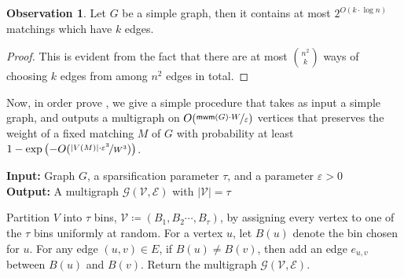 \documentclass[a4paper,11pt]{article}
\newcommand{\card}[1]{|#1|}
\newcommand{\paren}[1]{\left ( #1 \right )}
\newcommand{\eps}{\varepsilon}
\renewcommand{\algorithmicrequire}{\textbf{Input:}}
\renewcommand{\algorithmicensure}{\textbf{Output:}}
\theoremstyle{definition}
\theoremstyle{definition}
\theoremstyle{definition}
\theoremstyle{definition}
\theoremstyle{definition}
\theoremstyle{definition}
\theoremstyle{definition}
\newtheorem{observation2}[definition2]{Observation}
\theoremstyle{definition}
\theoremstyle{definition}
\theoremstyle{definition}
\theoremstyle{definition}
\theoremstyle{definition}
\theoremstyle{definition}
\theoremstyle{definition}
\theoremstyle{definition}
\begin{document}
\simpletomulti*

\begin{observation2}
Let $G$ be a simple graph, then it contains at most $2^{O(k\cdot \log n)}$ matchings which have $k$ edges.
\end{observation2}
\begin{proof}
This is evident from the fact that there are at most ${n^2 \choose k}$ ways of choosing $k$ edges from among $n^2$ edges in total. 
\end{proof}

Now, in order prove , we give a simple procedure that takes as input a simple graph, and outputs a multigraph on $O(\nicefrac{\textsf{mwm}(G)\cdot W}{\eps})$ vertices that preserves the weight of a fixed matching $M$ of $G$ with probability at least $1-\exp\paren{-O(\nicefrac{\card{V(M)}\cdot \eps^3}{W^3})}$.

\begin{algorithm}[H]
	\algorithmicrequire{ Graph $G$, a sparsification parameter $\tau$, and a parameter $\eps>0$}\\
	\algorithmicensure{ A multigraph $\mathcal{G}(\mathcal{V},\mathcal{E})$ with $\card{\mathcal{V}}=\tau$}
	\caption{\textsc{Vertex-Red-Basic}($G,\tau,\eps$)}
	\begin{algorithmic}[1]
		\State Partition $V$ into $\tau$ bins, $\mathcal{V}\coloneqq (B_1,B_2\cdots, B_{\tau})$, by assigning every vertex to one of the $\tau$ bins uniformly at random. 
		\State For a vertex $u$, let $B(u)$ denote the bin chosen for $u$. For any edge $(u,v)\in E$, if $B(u)\neq B(v)$, then add an edge $e_{u,v}$ between $B(u)$ and $B(v)$.
		\State Return the multigraph $\mathcal{G}(\mathcal{V},\mathcal{E})$.
	\end{algorithmic}
	\label{alg:vertexred}
\end{algorithm}
\end{document}
